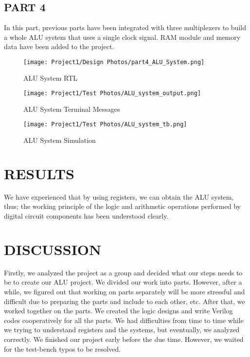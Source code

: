 \documentclass[pdftex,12pt,a4paper]{article}
\begin{document}
\subsection{PART 4}
In this part, previous parts have been integrated with three multiplexers to build a whole ALU system that uses a single clock signal. RAM module and memory data have been added to the project.

\begin{figure}[H]
	\centering
	\texttt{[image: Project1/Design Photos/part4\_ALU\_System.png]}	
	\caption{ALU System RTL}
	\label{figeleven}
\end{figure}

\begin{figure}[H]
	\centering
	\texttt{[image: Project1/Test Photos/ALU\_system\_output.png]}	
	\caption{ALU System Terminal Messages}
	\label{figtwelve}
\end{figure}

\begin{figure}[H]
	\centering
	\texttt{[image: Project1/Test Photos/ALU\_system\_tb.png]}	
	\caption{ALU System Simulation}
	\label{figthirteen}
\end{figure}



\section{RESULTS}
We have experienced that by using registers, we can obtain the ALU system, thus; the working principle of the logic and arithmetic operations performed by digital circuit components has been understood clearly.


\section{DISCUSSION}
Firstly,  we analyzed the project as a group and decided what our steps needs to be to create our ALU project. We divided our work into parts. However, after a while, we figured out that working on parts separately will be more stressful and difficult due to preparing the parts and include to each other, etc. After that, we worked together on the parts. We created the logic designs and write Verilog codes cooperatively for all the parts. We had difficulties from time to time while we trying to understand registers and the systems, but eventually, we analyzed correctly. We finished our project early before the due time. However, we waited for the test-bench typos to be resolved.
\end{document}
